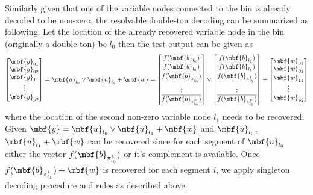 \documentclass[conference,,twocolumn]{IEEEtran}
\begin{document}
Similarly given that one of the variable nodes connected to the bin is already decoded to be non-zero, the resolvable double-ton decoding can be summarized as following. Let the location of the already recovered variable node in the bin (originally a double-ton) be $l_0$ then the test output can be given as 
\begin{align*}
\begin{bmatrix}
\mbf{y}_{01}\\
\mbf{y}_{02}\\
\mbf{y}_{11}\\
\vdots \\
\mbf{y}_{p2}\\
\end{bmatrix}
=\mbf{u}_{l_0} \vee \mbf{u}_{l_1}+\mbf{w}=
\begin{bmatrix}
f(\mbf{b}_{l_0})\\
\vspace{2pt}
\overline{f(\mbf{b}_{l_0})}\\
f(\mbf{b}_{\pi^1_{l_0}})\\
\vdots \\
\overline{f(\mbf{b}_{\pi^p_{l_0}})}\\
\end{bmatrix} 
\vee
\begin{bmatrix}
f(\mbf{b}_{l_1})\\
\vspace{2pt}
\overline{f(\mbf{b}_{l_1})}\\
f(\mbf{b}_{\pi^1_{l_1}})\\
\vdots \\
\overline{f(\mbf{b}_{\pi^p_{l_1}})}\\
\end{bmatrix}+
\begin{bmatrix}
\mbf{w}_{01}\\
\vspace{2pt}
\mbf{w}_{02}\\
\mbf{w}_{11}\\
\vdots \\
\mbf{w}_{p2}\\
\end{bmatrix}
\end{align*} 
where the location of the second non-zero variable node $l_1$ needs to be recovered. Given $\mbf{y}=\mbf{u}_{l_0} \vee \mbf{u}_{l_1}+\mbf{w}$ and $\mbf{u}_{l_0}$, $\mbf{u}_{l_1}+\mbf{w}$ can be recovered since for each segment of $\mbf{u}_{l_0}$ either the vector $f(\mbf{b}_{\pi^k_{l_0}})$ or it's complement is available. Once $f(\mbf{b}_{\pi_{l_1}^i})+\mbf{w}$ is recovered for each segment $i$, we apply singleton decoding procedure and rules as described above.
\end{document}
